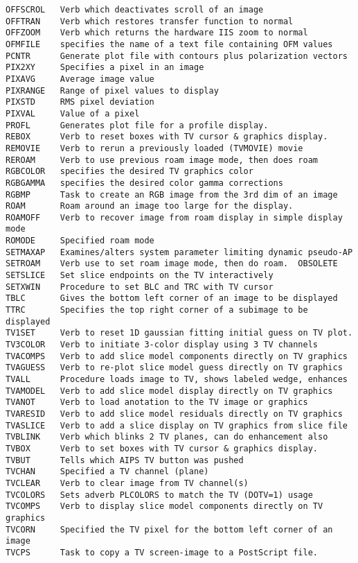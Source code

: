 \begin{verbatim}
OFFSCROL   Verb which deactivates scroll of an image
OFFTRAN    Verb which restores transfer function to normal
OFFZOOM    Verb which returns the hardware IIS zoom to normal
OFMFILE    specifies the name of a text file containing OFM values
PCNTR      Generate plot file with contours plus polarization vectors
PIX2XY     Specifies a pixel in an image
PIXAVG     Average image value
PIXRANGE   Range of pixel values to display
PIXSTD     RMS pixel deviation
PIXVAL     Value of a pixel
PROFL      Generates plot file for a profile display.
REBOX      Verb to reset boxes with TV cursor & graphics display.
REMOVIE    Verb to rerun a previously loaded (TVMOVIE) movie
REROAM     Verb to use previous roam image mode, then does roam
RGBCOLOR   specifies the desired TV graphics color
RGBGAMMA   specifies the desired color gamma corrections
RGBMP      Task to create an RGB image from the 3rd dim of an image
ROAM       Roam around an image too large for the display.
ROAMOFF    Verb to recover image from roam display in simple display mode
ROMODE     Specified roam mode
SETMAXAP   Examines/alters system parameter limiting dynamic pseudo-AP
SETROAM    Verb use to set roam image mode, then do roam.  OBSOLETE
SETSLICE   Set slice endpoints on the TV interactively
SETXWIN    Procedure to set BLC and TRC with TV cursor
TBLC       Gives the bottom left corner of an image to be displayed
TTRC       Specifies the top right corner of a subimage to be displayed
TV1SET     Verb to reset 1D gaussian fitting initial guess on TV plot.
TV3COLOR   Verb to initiate 3-color display using 3 TV channels
TVACOMPS   Verb to add slice model components directly on TV graphics
TVAGUESS   Verb to re-plot slice model guess directly on TV graphics
TVALL      Procedure loads image to TV, shows labeled wedge, enhances
TVAMODEL   Verb to add slice model display directly on TV graphics
TVANOT     Verb to load anotation to the TV image or graphics
TVARESID   Verb to add slice model residuals directly on TV graphics
TVASLICE   Verb to add a slice display on TV graphics from slice file
TVBLINK    Verb which blinks 2 TV planes, can do enhancement also
TVBOX      Verb to set boxes with TV cursor & graphics display.
TVBUT      Tells which AIPS TV button was pushed
TVCHAN     Specified a TV channel (plane)
TVCLEAR    Verb to clear image from TV channel(s)
TVCOLORS   Sets adverb PLCOLORS to match the TV (DOTV=1) usage
TVCOMPS    Verb to display slice model components directly on TV graphics
TVCORN     Specified the TV pixel for the bottom left corner of an image
TVCPS      Task to copy a TV screen-image to a PostScript file.

\end{verbatim}

